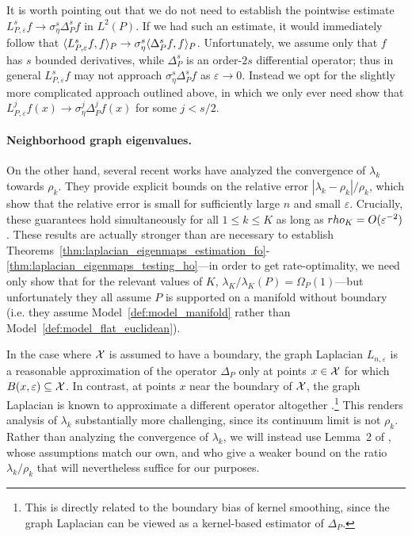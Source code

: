 It is worth pointing out that we do not need to establish the pointwise estimate $L_{P,\varepsilon}^sf \to \sigma_{\eta}^s\Delta_{P}^sf$ in $L^2(P)$. If we had such an estimate, it would immediately follow that $\langle L_{P,\varepsilon}^sf, f \rangle_{P} \to \sigma_{\eta}^s\langle \Delta_P^sf, f \rangle_{P}$. Unfortunately, we assume only that $f$ has $s$ bounded derivatives, while $\Delta_P^s$ is an order-$2s$ differential operator; thus in general $L_{P,\varepsilon}^sf$ may not approach $\sigma_{\eta}^s\Delta_{P}^sf$ as $\varepsilon \to 0$. Instead we opt for the slightly more complicated approach outlined above, in which we only ever need show that $L_{P,\varepsilon}^jf(x) \to \sigma_{\eta}^j \Delta_P^jf(x)$ for some $j < s/2$. 

\paragraph{Neighborhood graph eigenvalues.}
On the other hand, several recent works \citep{burago2014,garciatrillos18,calder2019} have analyzed the convergence of $\lambda_{k}$ towards $\rho_k$. They provide explicit bounds on the relative error $|\lambda_{k} - \rho_k|/\rho_k$, which show that the relative error is small for sufficiently large $n$ and small $\varepsilon$. Crucially, these guarantees hold simultaneously for all $1 \leq k \leq K$ as long as $\\rho_K = O(\varepsilon^{-2})$. These results are actually stronger than are necessary to establish Theorems~\ref{thm:laplacian_eigenmaps_estimation_fo}-\ref{thm:laplacian_eigenmaps_testing_ho}---in order to get rate-optimality, we need only show that for the relevant values of $K$, $\lambda_{K}/\lambda_K(P) = \Omega_P(1)$---but unfortunately they all assume $P$ is supported on a manifold without boundary (i.e. they assume Model~\ref{def:model_manifold} rather than Model~\ref{def:model_flat_euclidean}). 

In the case where $\mathcal{X}$ is assumed to have a boundary, the graph Laplacian $L_{n,\varepsilon}$ is a reasonable approximation of the operator $\Delta_P$ only at points $x \in \mathcal{X}$ for which $B(x,\varepsilon) \subseteq \mathcal{X}$. In contrast, at points $x$ near the boundary of $\mathcal{X}$, the graph Laplacian is known to approximate a different operator altogether \citep{belkin2012}.\footnote{This is directly related to the boundary bias of kernel smoothing, since the graph Laplacian can be viewed as a kernel-based estimator of $\Delta_P$.} This renders analysis of $\lambda_k$ substantially more challenging, since its continuum limit is not $\rho_k$.  Rather than analyzing the convergence of $\lambda_k$, we will instead use Lemma~2 of \cite{green2021}, whose assumptions match our own, and who give a weaker bound on the ratio $\lambda_k/\rho_k$ that will nevertheless suffice for our purposes. 

